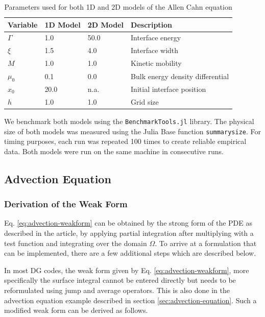 \documentclass[asi,article,submit,moreauthors]{Definitions/mdpi}
\begin{document}
\begin{table}[htbp!]
    \centering
    \caption{Parameters used for both 1D and 2D models of the Allen Cahn equation}
    \label{tab:ac-parameters}
    \begin{tabular}{llll} 
    \toprule
    \textbf{Variable} & \textbf{1D Model} & \textbf{2D Model} & \textbf{Description} \\ 
    \hline
    $\Gamma$ & 1.0 & 50.0 & Interface energy \\
    $\xi$ & 1.5 & 4.0 & Interface width \\
    $M$ & 1.0 & 1.0 & Kinetic mobility \\
    $\mu_0$ & 0.1 & 0.0 & Bulk energy density differential \\
    $x_0$ & 20.0 & n.a. & Initial interface position \\
    $h$ & 1.0 & 1.0 & Grid size \\
    \bottomrule
    \end{tabular}
    \end{table}

We benchmark both models using the \texttt{BenchmarkTools.jl} library.
The physical size of both models was measured using the Julia Base function \texttt{summarysize}.
For timing purposes, each run was repeated 100 times to create reliable empirical data.
Both models were run on the same machine in consecutive runs.

\subsection[\appendixname~\thesubsection]{Advection Equation}

\subsubsection[\appendixname~\thesubsubsection]{Derivation of the Weak Form}

Eq. \ref{eq:advection-weakform} can be obtained by the strong form of the PDE as described in the article, by applying partial integration after multiplying with a test function and integrating over the domain $\Omega$.
To arrive at a formulation that can be implemented, there are a few additional steps which are described below.

In most DG codes, the weak form given by Eq. \ref{eq:advection-weakform}, more specifically the surface integral cannot be entered directly but needs to be reformulated using jump and average operators.
This is also done in the advection equation example described in section \ref{sec:advection-equation}.
Such a modified weak form can be derived as follows.
\end{document}

